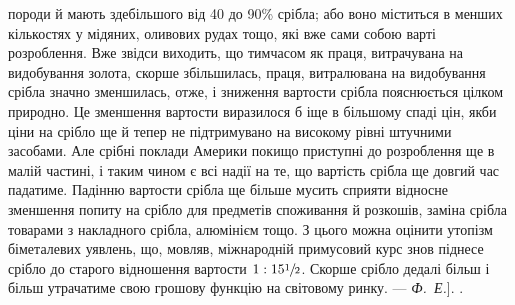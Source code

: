 {породи й мають здебільшого від 40 до 90\% срібла; або воно міститься
в менших кількостях у мідяних, оливових рудах тощо, які вже сами собою
варті розроблення. Вже звідси виходить, що тимчасом як праця,
витрачувана на видобування золота, скорше збільшилась, праця, витралювана
на видобування срібла значно зменшилась, отже, і зниження
вартости срібла пояснюється цілком природно. Це зменшення вартости
виразилося б іще в більшому спаді цін, якби ціни на срібло ще й тепер
не підтримувано на високому рівні штучними засобами. Але срібні поклади
Америки покищо приступні до розроблення ще в малій частині, і таким
чином є всі надії на те, що вартість срібла ще довгий час падатиме. Падінню
вартости срібла ще більше мусить сприяти відносне зменшення попиту
на срібло для предметів споживання й розкошів, заміна срібла товарами
з накладного срібла, алюмінієм тощо. З цього можна оцінити утопізм
біметалевих уявлень, що, мовляв, міжнародній примусовий курс
знов піднесе срібло до старого відношення вартости $1 : 15\sfrac{1}{2}$. Скорше
срібло дедалі більш і більш утрачатиме свою грошову функцію на світовому
ринку. —\emph{ Ф.~Е.}].
}.

